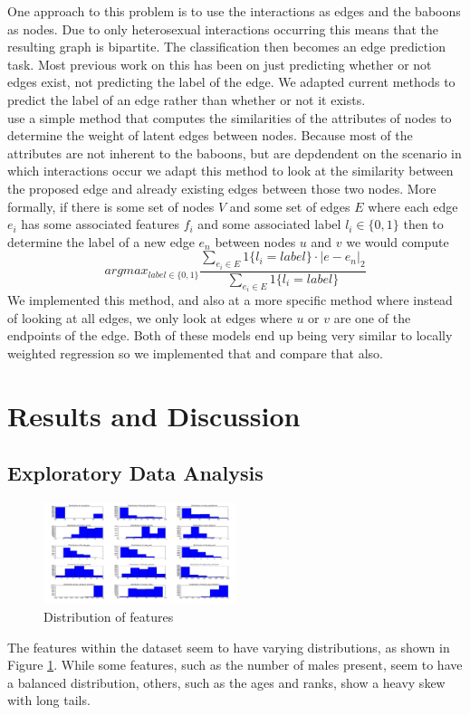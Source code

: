 \documentclass[twoside,twocolumn,paper=letter]{article}
\begin{document}
One approach to this problem is to use the interactions as edges and the baboons as nodes. Due to only heterosexual interactions occurring this means that the resulting graph is bipartite. The classification then becomes  an edge prediction task. Most previous work on this has been on just predicting whether or not edges exist, not predicting the label of the edge. We adapted current methods to predict the label of an edge rather than whether or not it exists. \\
\cite{Macskassy:2007} use a simple method that computes the similarities of the attributes of nodes to determine the weight of latent edges between nodes. Because most of the attributes are not inherent to the baboons, but are depdendent on the scenario in which interactions occur we adapt this method to look at the similarity between the proposed edge and already existing edges between those two nodes. More formally, if there is some set of nodes $V$ and some set of edges $E$ where each edge $e_i$ has some associated features $f_i$ and some associated label $l_i\in \{0,1\}$ then to determine the label of a new edge $e_n$ between nodes $u$ and $v$ we would compute 
$$argmax_{label \in \{0,1\}} \frac{\sum_{e_i \in E}1\{l_i=label\}\cdot|e-e_n|_2}{\sum_{e_i \in E}1\{l_i=label\}}$$
We implemented this method, and also at a more specific method where instead of looking at all edges, we only look at edges where $u$ or $v$ are one of the endpoints of the edge. Both of these models end up being very similar to locally weighted regression so we implemented that and compare that also. \\

\section{Results and Discussion}
\subsection{Exploratory Data Analysis}
\begin{figure}
      \centering
          \includegraphics[width=0.5\textwidth]{../figs/all_feats_histogram.png}
  \caption{Distribution of features}
  \label{fig:figure_distrib}
\end{figure}
The features within the dataset seem to have varying distributions, as shown in
Figure \ref{fig:figure_distrib}. While some features, such as the number of
males present, seem to have a balanced distribution, others, such as the ages
and ranks, show a heavy skew with long tails.
\end{document}
